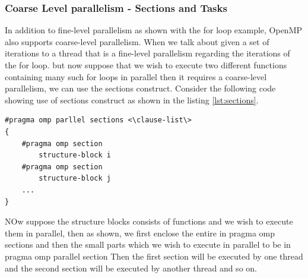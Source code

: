\documentclass[12pt]{article}
\begin{document}
\subsubsection{Coarse Level parallelism - Sections and Tasks}
In addition to fine-level parallelism as shown with the for loop example, OpenMP also supports coarse-level parallelism.
When we talk about given a set of iterations to a thread that is a fine-level parallelism regarding the iterations of the for loop.
but now suppose that we wish to execute two different functions containing many such for loops in parallel then it requires a coarse-level parallelism, we can use the sections construct.
Consider the following code showing use of sections construct as shown in the listing \ref{lst:sections}.
\begin{lstlisting}[caption={Sections Construct},captionpos=b,label={lst:sections}]
#pragma omp parllel sections <\clause-list\>
{
    #pragma omp section
        structure-block i
    #pragma omp section
        structure-block j
    ...
}
\end{lstlisting}
NOw suppose the structure blocks consists of functions and we wish to execute them in parallel, then as shown, we first enclose the entire in pragma omp sections and then 
the small parts which we wish to execute in parallel to be in pragma omp parallel section
Then the first section will be executed by one thread and the second section will be executed by another thread and so on.
\end{document}
